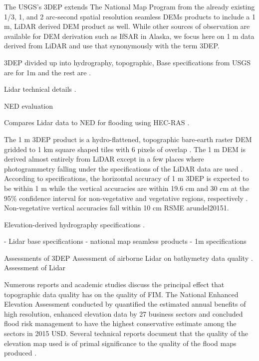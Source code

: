 \documentclass[preprint,review,12pt]{dependencies/elsarticle}
\begin{document}
The \ac{USGS}'s \ac{3DEP} extends The National Map Program from the already existing 1/3, 1, and 2 arc-second spatial resolution seamless \acp{DEM} products to include a 1 \ac{m}, \ac{LiDAR} derived \ac{DEM} product as well.
While other sources of observation are available for \ac{DEM} derivation such as \ac{IfSAR} in Alaska, we focus here on 1 \ac{m} data derived from \ac{LiDAR} and use that synonymously with the term \ac{3DEP}.

3DEP divided up into hydrography, topographic, 
Base specifications from USGS are \citep{arundel20151} for 1m and the rest are \citep{archuleta2017national}.

Lidar technical details \citep{stoker2015usgs}.

NED evaluation \citep{gesch2014accuracy,dobbs2010evaluation}

Compares Lidar data to NED for flooding using HEC-RAS \citep{wang2005comparison}.

The 1 \ac{m} \ac{3DEP} product is a hydro-flattened, topographic bare-earth raster \ac{DEM} gridded to 1 \ac{km} square shaped tiles with 6 pixels of overlap \citep{arundel20151}.
The 1 \ac{m} \ac{DEM} is derived almost entirely from \ac{LiDAR} except in a few places where photogrammetry falling under the specifications of the \ac{LiDAR} data are used \citep{arundel20151}.
According to specifications, the horizontal accuracy of 1 \ac{m} \ac{3DEP} is expected to be within 1 \ac{m} while the vertical accuracies are within 19.6 \ac{cm} and 30 \ac{cm} at the 95\% confidence interval for non-vegetative and vegetative regions, respectively \citep{arundel20151}.
Non-vegetative vertical accuracies fall within 10 \ac{cm} \ac{RSME} \ac{arundel20151}.

Elevation-derived hydrography specifications \citep{terziotti2020elevation}.

- Lidar base specifications \citep{heidemann2012lidar}
- national map seamless products \citep{archuleta2017national}
- 1m specifications \citep{arundel20151}


Assessments of 3DEP \citep{stoker2022accuracy,kim2020positional,chirico2020evaluating,callahan2022vertical,scott2022statewide,dobbs2010evaluation}
Assessment of airborne Lidar on bathymetry data quality \citep{hilldale2008assessing}.
Assessment of Lidar \citep{tarolli2014high}

Numerous reports and academic studies discuss the principal effect that topographic data quality has on the quality of \ac{FIM}.
The National Enhanced Elevation Assessment conducted by \citet{dewberry2011final} quantified the estimated annual benefits of high resolution, enhanced elevation data by 27 business sectors and concluded flood risk management to have the highest conservative estimate among the sectors in 2015 \ac{USD}.
Several technical reports document that the quality of the elevation map used is of primal significance to the quality of the flood maps produced \citep{national2007elevation,national2009mapping}.
\end{document}
